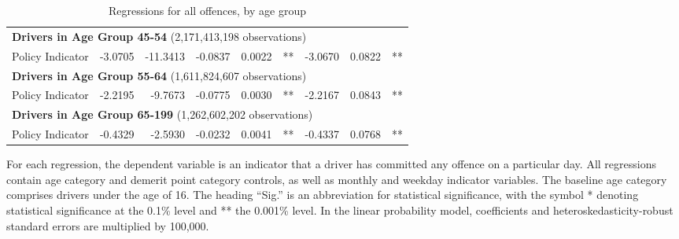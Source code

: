 \begin{table}
\begin{tabular}{l r r r r l r r l}
\hline 

\multicolumn{8}{l}{\textbf{Drivers in Age Group 45-54} (2,171,413,198 observations)} \\ 

Policy Indicator        &  -3.0705        &  -11.3413       &  -0.0837        &  0.0022       &   **       &  -3.0670        &  0.0822       &   **       \\ 

\hline 

\multicolumn{8}{l}{\textbf{Drivers in Age Group 55-64} (1,611,824,607 observations)} \\ 

Policy Indicator        &  -2.2195        &  -9.7673       &  -0.0775        &  0.0030       &   **       &  -2.2167        &  0.0843       &   **       \\ 

\hline 

\multicolumn{8}{l}{\textbf{Drivers in Age Group 65-199} (1,262,602,202 observations)} \\ 

Policy Indicator        &  -0.4329        &  -2.5930       &  -0.0232        &  0.0041       &   **       &  -0.4337        &  0.0768       &   **       \\ 

\hline 

\end{tabular} 
\caption{Regressions for all offences, by age group} 
For each regression, the dependent variable is an indicator that a driver has committed  
any offence on a particular day.  
All regressions contain age category and demerit point category controls, 
as well as monthly and weekday indicator variables. 
The baseline age category comprises drivers under the age of 16. 
The heading ``Sig.'' is an abbreviation for statistical significance, with 
the symbol * denoting statistical significance at the 0.1\% level 
and ** the 0.001\% level. 
In the linear probability model, coefficients and heteroskedasticity-robust standard errors are  
multiplied by 100,000.  
\label{tab:seas_Logit_vs_LPMx100K_regs_by_age} 
\end{table} 
 
